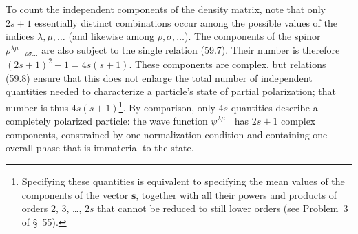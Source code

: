 To count the independent components of the density matrix, note that only
$2s+1$ essentially distinct combinations occur among the possible values of
the indices $\lambda,\mu,\ldots$ (and likewise among
$\rho,\sigma,\ldots$). The components of the spinor
$\rho^{\lambda\mu\ldots}{}_{\rho\sigma\ldots}$ are also subject to the single
relation (59.7). Their number is therefore
$(2s+1)^2-1=4s(s+1)$. These components are complex, but relations (59.8) ensure
that this does not enlarge the total number of independent quantities needed
to characterize a particle's state of partial polarization; that number is
thus $4s(s+1)$\footnote{Specifying these quantities is equivalent to specifying
the mean values of the components of the vector $\mathbf s$, together with
all their powers and products of orders 2, 3, \ldots, $2s$ that cannot be
reduced to still lower orders (see Problem~3 of \S~55).}. By comparison, only
$4s$ quantities describe a completely polarized particle: the wave function
$\psi^{\lambda\mu\ldots}$ has $2s+1$ complex components, constrained by one
normalization condition and containing one overall phase that is immaterial
to the state.
